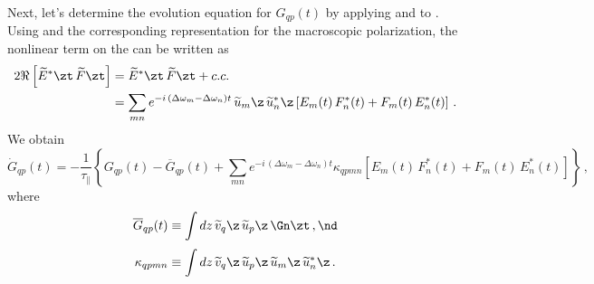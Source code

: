Next, let's determine the evolution equation for $G_{q p}(t)$ by applying  and  to . Using  and the corresponding representation for the macroscopic polarization, the nonlinear term on the \rhs can be written as
\begin{equation*}
  \begin{split}
    2 \Re \left[ \widetilde{E}^\ast\zt\, \widetilde{F}\zt \right] &= \widetilde{E}^\ast\zt\, \widetilde{F}\zt + c.c. \\
    &= \sum_{m n}  e^{-i\, \left(\Delta \omega_m - \Delta \omega_n\right) t}\, \widetilde{u}_m\z\, \widetilde{u}_n^\ast\z \left[ E_m(t)\, F_n^\ast(t) + F_m(t)\, E_n^\ast(t) \right]\, .
  \end{split}
\end{equation*}
We obtain
\begin{equation} \label{eqn:mml_gtz_gqp_temp}
  \dot{G}_{q p}(t) = -\frac{1}{\tau_\parallel} \left\{ G_{q p}(t) - \overline{G}_{q p}(t)  + \sum_{m n} e^{-i\, \left(\Delta \omega_m - \Delta \omega_n\right) t} \kappa_{q p m n} \left[ E_m(t)\, F_n^\ast(t) + F_m(t)\, E_n^\ast(t) \right] \right\}\, ,
\end{equation}
where
\begin{equation} \label{eqn:mml_gqp_bar_def}
  \overline{G}_{q p}(t) \equiv \int d z\, \widetilde{v}_q\z\, \widetilde{u}_p\z\, \Gn\zt\, , \nd
\end{equation}
\begin{equation} \label{eqn:mml_kqp_mn_def}
  \kappa_{q p m n} \equiv \int d z\, \widetilde{v}_q\z\, \widetilde{u}_p\z\, \widetilde{u}_m\z\, \widetilde{u}_n^\ast\z\, .
\end{equation}


